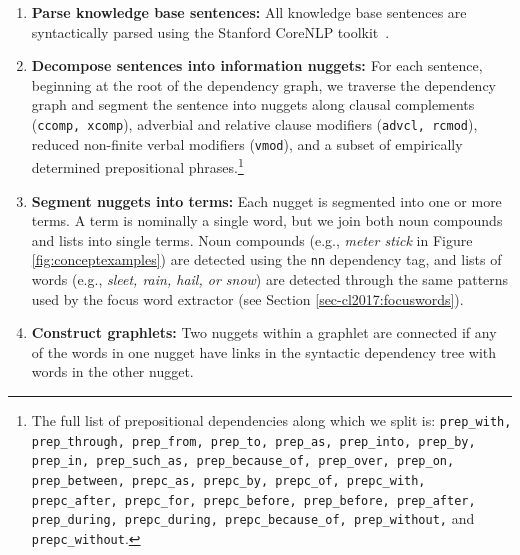\begin{enumerate}

\item{\textbf{Parse knowledge base sentences: } 
All knowledge base sentences are syntactically parsed using the Stanford CoreNLP toolkit~\cite{manning2014stanford}.}


\item {\textbf{Decompose sentences into information nuggets: \label{step:creatinggraphlets}} 
For each sentence, beginning at the root of the dependency graph, we traverse the dependency graph and segment the sentence into nuggets along clausal complements ({\tt ccomp, xcomp}), adverbial and relative clause modifiers ({\tt advcl, rcmod}), reduced non-finite verbal modifiers ({\tt vmod}), and a subset of empirically determined prepositional phrases.\footnote{The full list of prepositional dependencies along which we split is: {\tt prep\_with, prep\_through, prep\_from, prep\_to, prep\_as, prep\_into, prep\_by, prep\_in, prep\_such\_as, prep\_because\_of, prep\_over, prep\_on, prep\_between, prepc\_as, prepc\_by, prepc\_of, prepc\_with, prepc\_after, prepc\_for, prepc\_before, prep\_before, prep\_after, prep\_during, prepc\_during, prepc\_because\_of, prep\_without,} and {\tt prepc\_without}.}
}

\item {\textbf{Segment nuggets into terms: }
Each nugget is segmented into one or more terms.  A term is nominally a single word, but we join both noun compounds and lists into single terms.  Noun compounds (e.g., \emph{meter stick} in Figure \ref{fig:conceptexamples}) are detected using the {\tt nn} dependency tag, and lists of words (e.g., \emph{sleet, rain, hail, or snow}) are detected through the same patterns used by the focus word extractor (see Section \ref{sec-cl2017:focuswords}).
}


\item {\textbf{Construct graphlets:} Two nuggets within a graphlet are connected if any of the words in one nugget have links in the syntactic dependency tree with words in the other nugget. } 


\end{enumerate}
